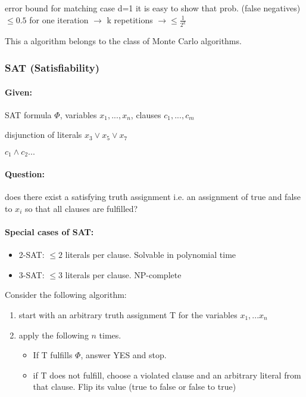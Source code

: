 \documentclass[11pt]{article}
\theoremstyle{definition}
\theoremstyle{definition}
\begin{document}
error bound for matching case d=1
it is easy to show that prob. (false negatives) $\leq 0.5 $ for one iteration $\rightarrow$ k repetitions $\rightarrow \leq \frac{1}{2^k} $ \newline

This a algorithm belongs to the class of Monte Carlo algorithms.

\subsubsection{SAT (Satisfiability)}

\paragraph{Given:} SAT formula $\Phi $, variables $ x_1, ..., x_n$, clauses $ c_1, ..., c_m$

disjunction of literals $x_3 \vee x_5 \vee x_7 $

$ c_1 \wedge c_2...$

\paragraph{Question:} does there exist a satisfying truth assignment i.e. an assignment of true and false to $ x_i $ so that all clauses are fulfilled?

\paragraph{Special cases of SAT:}
\begin{itemize}
\item 2-SAT: $\leq 2$ literals per clause. Solvable in polynomial time
\item 3-SAT: $\leq 3$ literals per clause. NP-complete
\end{itemize} \medskip

Consider the following algorithm:
\begin {enumerate}
\item start with an arbitrary truth assignment T for the variables $x_1,... x_n$

\item apply the following $ n $ times.
	\begin{itemize}
	\item If T fulfills $\Phi$, answer YES and stop.
	\item if T does not fulfill, choose a violated clause and an arbitrary literal from that clause. Flip its value (true to false or false to true)
	\end{itemize}
\end {enumerate}
\end{document}

